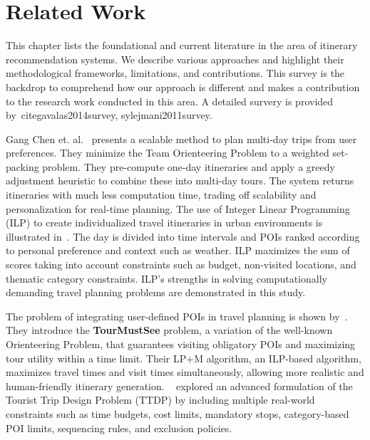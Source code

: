 \documentclass[sigconf,authordraft]{acmart}
\begin{document}
\section{Related Work}

This chapter lists the foundational and current literature in the area of itinerary recommendation systems. We describe various approaches and highlight their methodological frameworks, limitations, and contributions. This survey is the backdrop to comprehend how our approach is different and makes a contribution to the research work conducted in this area. A detailed survery is provided by~cite{gavalas2014survey, sylejmani2011survey}.

Gang Chen et. al.~\cite{chen2014automatic} presents a scalable method to plan multi-day trips from user preferences. They minimize the Team Orienteering Problem to a weighted set-packing problem. They pre-compute one-day itineraries and apply a greedy adjustment heuristic to combine these into multi-day tours. The system returns itineraries with much less computation time, trading off scalability and personalization for real-time planning. The use of Integer Linear Programming (ILP) to create individualized travel itineraries in urban environments is illustrated in~\cite{vanzelst2016itinerary}. The day is divided into time intervals and POIs ranked according to personal preference and context such as weather. ILP maximizes the sum of scores taking into account constraints such as budget, non-visited locations, and thematic category constraints. ILP's strengths in solving computationally demanding travel planning problems are demonstrated in this study.

The problem of integrating user-defined POIs in travel planning is shown by~\cite{taylor2018tour}. They introduce the \textbf{TourMustSee} problem, a variation of the well-known Orienteering Problem, that guarantees visiting obligatory POIs and maximizing tour utility within a time limit. Their LP+M algorithm, an ILP-based algorithm, maximizes travel times and visit times simultaneously, allowing more realistic and human-friendly itinerary generation. ~\cite{vu2022branch} explored an advanced formulation of the Tourist Trip Design Problem (TTDP) by including multiple real-world constraints such as time budgets, cost limits, mandatory stops, category-based POI limits, sequencing rules, and exclusion policies.
\end{document}
